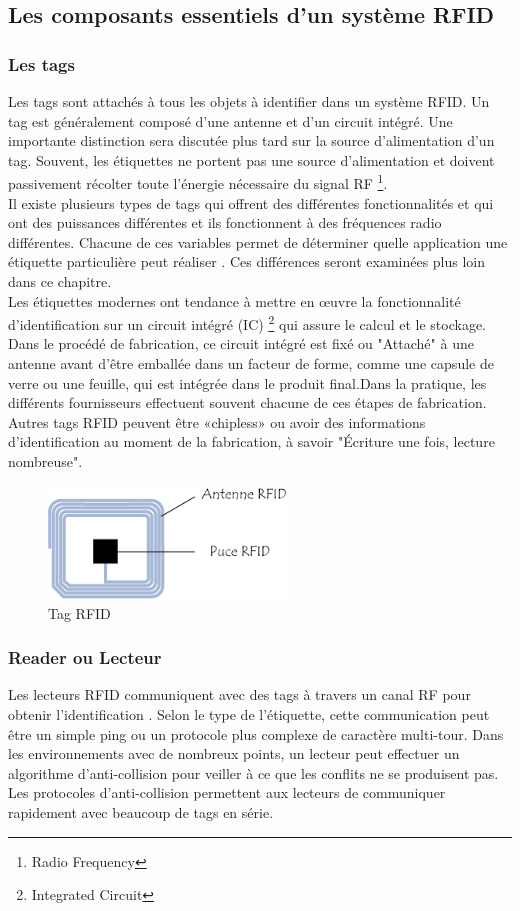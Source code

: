 \documentclass[11pt, a4paper, twoside]{book}
\begin{document}
\subsection{Les composants essentiels d'un système RFID}
\subsubsection{Les tags}
Les tags sont attachés à tous les objets à identifier dans un système RFID. Un tag est généralement
composé d'une antenne et d'un circuit intégré. Une importante
distinction sera discutée plus tard sur la source d'alimentation d'un tag. Souvent, les étiquettes ne portent pas une source d'alimentation et doivent passivement récolter toute l'énergie nécessaire du signal RF \footnote{Radio Frequency}.\\

Il existe plusieurs types de tags qui offrent des différentes fonctionnalités et qui ont des puissances différentes
et ils fonctionnent à des fréquences radio différentes. Chacune de ces variables permet de déterminer
quelle application une étiquette particulière peut réaliser . Ces différences seront examinées plus loin dans ce chapitre.\\

Les étiquettes modernes ont tendance à mettre en œuvre la fonctionnalité d'identification sur un circuit intégré (IC) \footnote{Integrated Circuit} qui
assure le calcul et le stockage. Dans le procédé de fabrication, ce circuit intégré est fixé ou
"Attaché" à une antenne avant d'être emballée dans un facteur de forme, comme une capsule de verre ou une feuille, qui est intégrée dans le produit final.Dans la pratique, les différents fournisseurs effectuent souvent chacune de ces étapes de fabrication. Autres tags RFID peuvent être «chipless» ou avoir des informations d'identification au moment de la fabrication, à savoir
"Écriture une fois, lecture nombreuse". \\
\begin{figure}[H]
\centering
\includegraphics[height=3cm]{tag}
\caption{Tag RFID}
\end{figure}
\subsubsection{Reader ou Lecteur}
Les lecteurs RFID communiquent avec des tags à travers un canal RF pour obtenir l'identification
. Selon le type de l'étiquette, cette communication peut être un simple ping ou un protocole plus complexe de caractère multi-tour. Dans les environnements avec de nombreux points, un lecteur peut effectuer un algorithme d'anti-collision pour veiller à ce que les conflits ne se produisent pas. Les protocoles d'anti-collision permettent aux lecteurs de communiquer rapidement avec beaucoup de tags en série.\\
\end{document}
